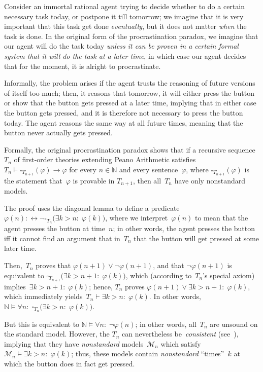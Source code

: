 \documentclass[12pt]{article}
\newcommand{\vp}{\varphi}
\newcommand{\NN}{\mathbb{N}}
\newcommand{\cM}{\mathcal{M}}
\theoremstyle{plain}
\theoremstyle{definition}
\theoremstyle{remark}
\begin{document}
Consider an immortal rational agent trying to decide whether to do a certain necessary task today, or postpone it till tomorrow; we imagine that it is very important that this task get done \emph{eventually}, but it does not matter \emph{when} the task is done. In the original form of the procrastination paradox, we imagine that our agent will do the task today \emph{unless it can be proven in a certain formal system that it will do the task at a later time}, in which case our agent decides that for the moment, it is alright to procrastinate.

Informally, the problem arises if the agent trusts the reasoning of future versions of itself too much; then, it reasons that tomorrow, it will either press the button or show that the button gets pressed at a later time, implying that in either case the button gets pressed, and it is therefore not necessary to press the button today. The agent reasons the same way at all future times, meaning that the button never actually gets pressed.

Formally, the original procrastination paradox shows that if a recursive sequence~$T_n$ of first-order theories extending Peano Arithmetic satisfies $T_n \vdash \square_{T_{n+1}}(\vp)\to\vp$ for every $n\in\NN$ and every sentence~$\vp$, where $\square_{T_{n+1}}(\vp)$ is the statement that~$\vp$ is provable in $T_{n+1}$, then all~$T_n$ have only nonstandard models.

The proof uses the diagonal lemma to define a predicate~$\vp(n) :\leftrightarrow \neg\square_{T_n}\big(\exists k>n{:}\;\vp(k)\big)$, where we interpret~$\vp(n)$ to mean that the agent presses the button at time~$n$; in other words, the agent presses the button iff it cannot find an argument that in~$T_n$ that the button will get pressed at some later time.

Then,~$T_n$ proves that $\vp(n+1)\vee\neg\vp(n+1)$, and that $\neg\vp(n+1)$ is equivalent to $\square_{T_{n+1}}\big(\exists k>n+1{:}\;\vp(k)\big)$, which (according to~$T_n$'s special axiom) implies~$\exists k>n+1{:}\;\vp(k)$; hence, $T_n$ proves $\vp(n+1)\vee\exists k>n+1{:}\;\vp(k)$, which immediately yields~$T_n\vdash\exists k>n{:}\;\vp(k)$. In other words, $\NN\vDash\forall n{:}\;\square_{T_n}\big(\exists k>n{:}\;\vp(k)\big)$. 

But this is equivalent to $\NN\vDash\forall n{:}\;\neg\vp(n)$; in other words, all~$T_n$ are unsound on the standard model. However, the $T_n$ can nevertheless be~\emph{consistent} (see~\cite{yudkowsky13}), implying that they have \emph{nonstandard} models~$\cM_n$ which satisfy $\cM_n\vDash\exists k>n{:}\;\vp(k)$; thus, these models contain \emph{nonstandard} ``times''~$k$ at which the button does in fact get pressed.
\end{document}
